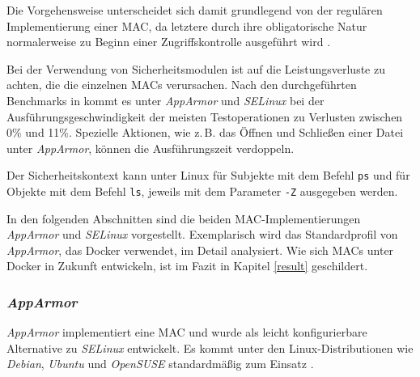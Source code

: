 \documentclass[../main.tex]{subfiles}
\begin{document}
			Die Vorgehensweise unterscheidet sich damit grundlegend von der regulären Implementierung einer MAC, da letztere durch ihre obligatorische Natur normalerweise zu Beginn einer Zugriffskontrolle ausgeführt wird \cite[S.3]{LSMFramework}.


			Bei der Verwendung von Sicherheitsmodulen ist auf die Leistungsverluste zu achten, die die einzelnen MACs verursachen. Nach den durchgeführten Benchmarks in \cite[S.51ff.]{SELinuxApparmor} kommt es unter \emph{AppArmor} und \emph{SELinux} bei der Ausführungsgeschwindigkeit der meisten Testoperationen zu Verlusten zwischen 0\% und 11\%. Spezielle Aktionen, wie z.\,B. das Öffnen und Schließen einer Datei unter \emph{AppArmor}, können die Ausführungszeit verdoppeln.



			Der Sicherheitskontext kann unter Linux für Subjekte mit dem Befehl \texttt{ps} und für Objekte mit dem Befehl \texttt{ls}, jeweils mit dem Parameter \texttt{-Z} ausgegeben werden.








			In den folgenden Abschnitten sind die beiden MAC-Implementierungen \emph{AppArmor} und \emph{SELinux} vorgestellt. Exemplarisch wird das Standardprofil von \emph{AppArmor}, das Docker verwendet, im Detail analysiert. Wie sich MACs unter Docker in Zukunft entwickeln, ist im Fazit in Kapitel \ref{result} geschildert.

			\subsubsection{\emph{AppArmor}}
			\label{apparmor}
				\emph{AppArmor} implementiert eine MAC und wurde als leicht konfigurierbare Alternative zu \emph{SELinux} entwickelt. Es kommt unter den Linux-Distributionen wie \emph{Debian}, \emph{Ubuntu} und \emph{OpenSUSE} standardmäßig zum Einsatz \cite{apparmorUbuntu}.
\end{document}
